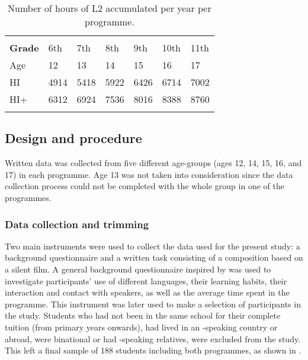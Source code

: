 \documentclass[output=paper]{langsci/langscibook}
\begin{document}
\begin{table}
\begin{tabularx}{\textwidth}{l YYYYYY} 
\lsptoprule
{}\\
\bfseries Grade & 6th & 7th & 8th & 9th & 10th & {11th}\\
\midrule 
 Age & {12} & 13 & 14 & 15 & 16 & 17\\
 HI & 4914 & 5418 & 5922 & 6426 & 6714 & {7002}\\
 HI+ & 6312 & 6924 & {7536} & {8016} & 8388 & 8760\\
\lspbottomrule
\end{tabularx} 
\caption{Number of hours of L2 accumulated per year per programme.}
\label{tab:tejada:2}
\end{table}

\subsection{Design and procedure}

Written data was collected from five different age-groups (ages 12, 14, 15, 16, and 17) in each programme. Age 13 was not taken into consideration since the data collection process could not be completed with the whole group in one of the programmes.

\subsubsection{Data collection and trimming}

Two main instruments were used to collect the data used for the present study: a  background questionnaire and a written task consisting of a composition based on a silent film.
A general  background questionnaire inspired by \citet{Grosjean2010} was used to investigate participants’ use of different languages, their learning habits, their  interaction and contact with  speakers, as well as the average time spent in the  programme. This instrument was later used to make a selection of participants in the study. Students who had not been in the same school for their complete tuition (from primary years onwards), had lived in an -speaking country or abroad, were binational or had -speaking relatives, were excluded from the study. This left a final sample of 188 students including both programmes, as shown in .
\end{document}
